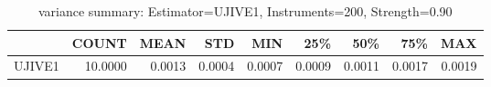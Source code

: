 \begin{table}[ht]
\centering
\caption{variance summary: Estimator=UJIVE1, Instruments=200, Strength=0.90}
\begin{tabular}{lrrrrrrrr}
\toprule
 & COUNT & MEAN & STD & MIN & 25\% & 50\% & 75\% & MAX \\
\midrule
UJIVE1 & 10.0000 & 0.0013 & 0.0004 & 0.0007 & 0.0009 & 0.0011 & 0.0017 & 0.0019 \\
\bottomrule
\end{tabular}
\end{table}
